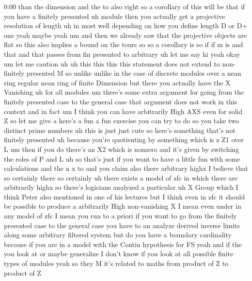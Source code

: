 \begin{unfinished}{0:00}
than  the
dimension  and  the  to
also  right  so  a  corollary  of  this  will
be  that  if  you  have  a  finitely
presented  uh  module  then  you  actually
get  a  projective  resolution  of  length  uh
in  most  well  depending  on  how  you  define
length  D  or  D+  one  yeah  maybe  yeah
um  and  then  we  already  saw  that  the
projective  objects  are  flat  so  this  also
implies  a  bound  on  the  tours  so  so  a
corollary
is  so  if  if  m  is  and  that  and  that
passes  from  fin  presented  to
arbitrary
uh
let  me
say
hi
yeah
okay
um  let  me  caution
uh  uh  this  this  this  this  statement  does
not
extend  to  non-finitely
presented  M  so  unlike  unlike  in  the  case
of  discrete  modules  over  a  nean  ring
regular  nean  ring  of  finite  Dimension
but  there  you  actually  have  the  X
Vanishing  uh  for  all  modules  um  there's
some  extra  argument  for  going  from  the
finitely  presented  case  to  the  general
case  that  argument  does  not  work  in  this
context  and  in  fact  um  I  think  you  can
have  arbitrarily  High  AXS  even  for  solid
Z  so  let  me  give  a  here's  a  fun  a  fun
exercise  you  can  try  to  do
so  you  take  two  distinct  prime  numbers
uh  this  is  just  just  cute  so  here's
something  that's  not  finitely
presented  uh  because  you're  quotienting
by  something  which  is  z  Z1  over
L  um  then  if  you  do  there's  an  X2  which
is  nonzero  and  it's  given  by  switching
the  roles  of  P  and
L  uh  so  that's  just  if  you  want  to  have
a  little  fun  with  some
calculations  and  the  n  x  to  and  you
claim  also  there  arbitrary  highx  I
believe  that  so  certainly  there  so
certainly  uh  there  exists  a  model  of  zfc
in  which  there  are  arbitrarily  highx  so
there's  logicians  analyzed  a  particular
uh  X  Group  which  I  think  Peter  also
mentioned  in  one  of  his  lectures  but  I
think  even  in  zfc  it  should  be  possible
to  produce  a  arbitrarily  High
non-vanishing  X  I  mean  even  under  in  any
model  of
zfc  I  mean  you  run  to  a  priori  if  you
want  to  go  from  the  finitely  presented
case  to  the  general  case  you  have  to  an
analyze  derived  inverse  limits  along
some  arbitrary  filtered  system  but  do
you  have  a  boundary
cardinality  because  if  you  are  in  a
model  with  the  Contin  hypothesis  for  FS
yeah  and  if  the  you  look  at  or  maybe
generalize  I  don't  know  if  you  look  at
all  possible  finite  types  of  modules
yeah  so  they  M  it's  related  to  maths
from  product  of  Z  to  product  of  Z

\end{unfinished}
